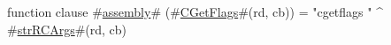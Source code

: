 function clause #\hyperref[sailMIPSzassembly]{assembly}# (#\hyperref[sailMIPSzCGetFlags]{CGetFlags}#(rd, cb)) = "cgetflags " ^ #\hyperref[sailMIPSzstrRCArgs]{strRCArgs}#(rd, cb)
